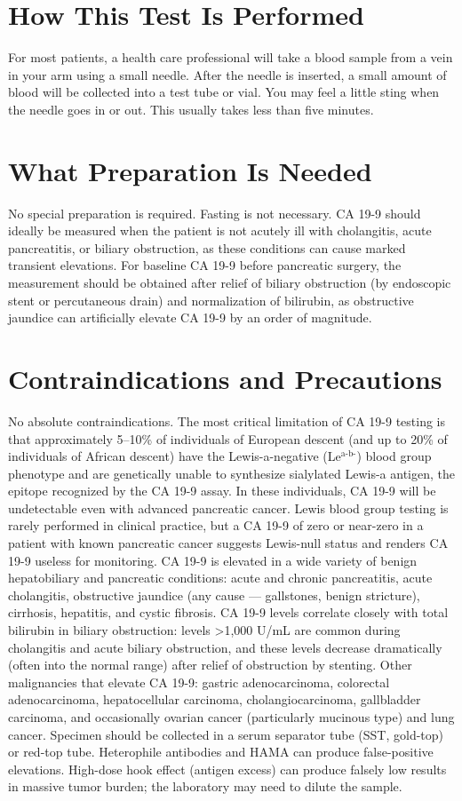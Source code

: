 \section*{How This Test Is Performed}
For most patients, a health care professional will take a blood sample from a vein in your arm using a small needle. After the needle is inserted, a small amount of blood will be collected into a test tube or vial. You may feel a little sting when the needle goes in or out. This usually takes less than five minutes.

\section*{What Preparation Is Needed}
No special preparation is required. Fasting is not necessary. CA 19-9 should ideally be measured when the patient is not acutely ill with cholangitis, acute pancreatitis, or biliary obstruction, as these conditions can cause marked transient elevations. For baseline CA 19-9 before pancreatic surgery, the measurement should be obtained after relief of biliary obstruction (by endoscopic stent or percutaneous drain) and normalization of bilirubin, as obstructive jaundice can artificially elevate CA 19-9 by an order of magnitude.

\section*{Contraindications and Precautions}
No absolute contraindications. The most critical limitation of CA 19-9 testing is that approximately 5--10\% of individuals of European descent (and up to 20\% of individuals of African descent) have the Lewis-a-negative (Le$^\text{a-b-}$) blood group phenotype and are genetically unable to synthesize sialylated Lewis-a antigen, the epitope recognized by the CA 19-9 assay. In these individuals, CA 19-9 will be undetectable even with advanced pancreatic cancer. Lewis blood group testing is rarely performed in clinical practice, but a CA 19-9 of zero or near-zero in a patient with known pancreatic cancer suggests Lewis-null status and renders CA 19-9 useless for monitoring. CA 19-9 is elevated in a wide variety of benign hepatobiliary and pancreatic conditions: acute and chronic pancreatitis, acute cholangitis, obstructive jaundice (any cause --- gallstones, benign stricture), cirrhosis, hepatitis, and cystic fibrosis. CA 19-9 levels correlate closely with total bilirubin in biliary obstruction: levels >1,000 U/mL are common during cholangitis and acute biliary obstruction, and these levels decrease dramatically (often into the normal range) after relief of obstruction by stenting. Other malignancies that elevate CA 19-9: gastric adenocarcinoma, colorectal adenocarcinoma, hepatocellular carcinoma, cholangiocarcinoma, gallbladder carcinoma, and occasionally ovarian cancer (particularly mucinous type) and lung cancer. Specimen should be collected in a serum separator tube (SST, gold-top) or red-top tube. Heterophile antibodies and HAMA can produce false-positive elevations. High-dose hook effect (antigen excess) can produce falsely low results in massive tumor burden; the laboratory may need to dilute the sample.

